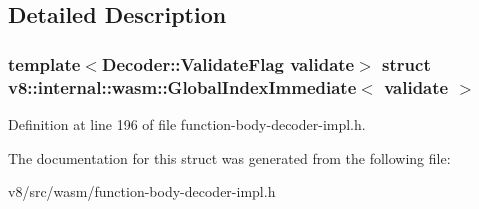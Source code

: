 \subsection{Detailed Description}
\subsubsection*{template$<$Decoder\+::\+Validate\+Flag validate$>$\newline
struct v8\+::internal\+::wasm\+::\+Global\+Index\+Immediate$<$ validate $>$}



Definition at line 196 of file function-\/body-\/decoder-\/impl.\+h.



The documentation for this struct was generated from the following file\+:\begin{DoxyCompactItemize}
\item 
v8/src/wasm/function-\/body-\/decoder-\/impl.\+h\end{DoxyCompactItemize}
